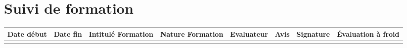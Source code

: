 \section*{\large Suivi de formation}

\begin{table}[H]
\centering
	\begin{tabularx}{16.8cm}{|X|X|X|X|X|X|X|X|}
	\hline
	\rowcolor{gray!40} \small Date début & \small Date fin & \small Intitulé Formation & \small Nature Formation & \small Evaluateur & \small Avis & \small Signature & \small Évaluation à froid \\
	\hline
	 & & & & & & & \\
	\hline
	\end{tabularx}
\end{table}

